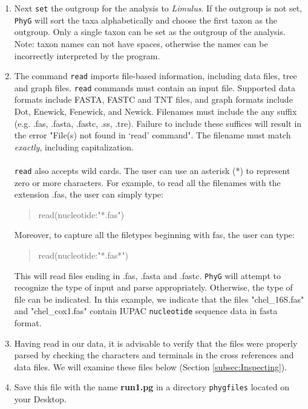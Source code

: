 \documentclass[11pt]{article}
\newcommand{\phyg}{\texttt{PhyG} }
\begin{document}
\begin{enumerate}
\item Next \texttt{set} the outgroup for the analysis to \emph{Limulus}. If the outgroup
is not set, \phyg will sort the taxa alphabetically and choose the first taxon as the
outgroup. Only a single taxon can be set as the outgroup of the analysis. Note: taxon 
names can not have spaces, otherwise the names can be incorrectly interpreted by
the program.

\item The command \texttt{read} imports file-based information, including data files, 
tree and graph files. \texttt{read} commands must contain an input file. Supported 
data formats include FASTA, FASTC and TNT files, and graph formats include Dot, 
Enewick, Fenewick, and Newick. Filenames must include the any suffix (e.g. 
.fas, .fasta, .fastc, .ss, .tre). Failure to include these suffices will result in the error 
"File(s) not found in `read' command". The filename must match \textit{exactly}, 
including capitalization.\\
\\
\texttt{read} also accepts wild cards. The user can use an asterisk (*) to represent 
zero or more characters. For example, to read all the filenames with the extension .fas, 
the user can simply type:
        
        \begin{quote}
	read(nucleotide:"*.fas")\\
	\end{quote}
	
Moreover, to capture all the filetypes beginning with fas, the user can type: 
	
	\begin{quote}
	read(nucleotide:"*.fas*")\\
	\end{quote}

This will read files ending in .fas, .fasta and .fastc. \phyg will attempt to recognize 
the type of input and parse appropriately. Otherwise, the type of file can be 
indicated. In this example, we indicate that the files "chel\_16S.fas" and 
"chel\_cox1.fas" contain IUPAC \texttt{nucleotide} sequence data in fasta format.

\item Having read in our data, it is advisable to verify that the files were properly 
parsed by checking the characters and terminals in the cross references and data 
files. We will examine these files below (Section \ref{subsec:Inspecting}).

\item Save this file with the name \textbf{run1.pg} in a directory \texttt{phygfiles} 
located on your Desktop.

\end{enumerate}
\end{document}
